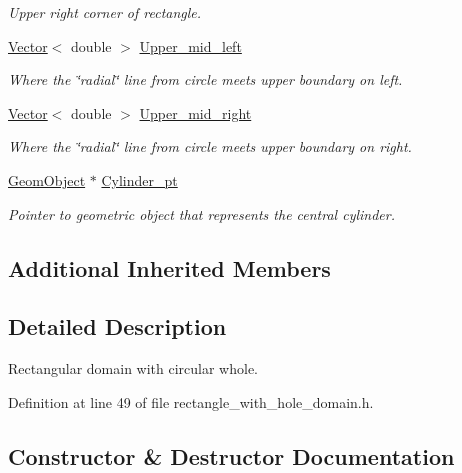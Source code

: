 \begin{DoxyCompactItemize}
\begin{DoxyCompactList}\small\item\em Upper right corner of rectangle. \end{DoxyCompactList}\item 
\hyperlink{classoomph_1_1Vector}{Vector}$<$ double $>$ \hyperlink{classoomph_1_1RectangleWithHoleDomain_a025fb05e2f6905e62459ecd45ed389e2}{Upper\+\_\+mid\+\_\+left}
\begin{DoxyCompactList}\small\item\em Where the \char`\"{}radial\char`\"{} line from circle meets upper boundary on left. \end{DoxyCompactList}\item 
\hyperlink{classoomph_1_1Vector}{Vector}$<$ double $>$ \hyperlink{classoomph_1_1RectangleWithHoleDomain_aa38db31456f7dd847e13d03d96fc99aa}{Upper\+\_\+mid\+\_\+right}
\begin{DoxyCompactList}\small\item\em Where the \char`\"{}radial\char`\"{} line from circle meets upper boundary on right. \end{DoxyCompactList}\item 
\hyperlink{classoomph_1_1GeomObject}{Geom\+Object} $\ast$ \hyperlink{classoomph_1_1RectangleWithHoleDomain_a4ca65e1f063e65c4254a594db66fabf8}{Cylinder\+\_\+pt}
\begin{DoxyCompactList}\small\item\em Pointer to geometric object that represents the central cylinder. \end{DoxyCompactList}\end{DoxyCompactItemize}
\subsection*{Additional Inherited Members}


\subsection{Detailed Description}
Rectangular domain with circular whole. 

Definition at line 49 of file rectangle\+\_\+with\+\_\+hole\+\_\+domain.\+h.



\subsection{Constructor \& Destructor Documentation}
\mbox{\label{classoomph_1_1RectangleWithHoleDomain_a3c685f6d35bb842d50062ccaa63a5486}} 
